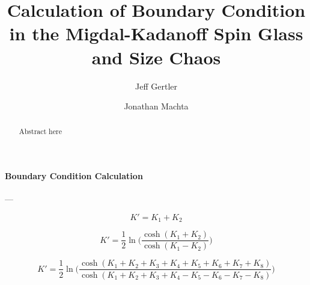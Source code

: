 \documentclass[twocolumn,aps,showpacs,superscriptaddress,prl]{revtex4}
\begin{document}
\title{Calculation of Boundary Condition in the Migdal-Kadanoff Spin Glass and Size Chaos}


\author{Jeff Gertler}


\author{Jonathan Machta}

\begin{abstract}

Abstract here

\end{abstract}

\maketitle



\paragraph*{Boundary Condition Calculation} ---


\begin{equation}
K' = K_1 + K_2
\label{eq:par}
\end{equation}

\begin{equation}
K' = \frac{1}{2}\ln \Big(\frac{\cosh(K_1+K_2)}{\cosh(K_1-K_2)} \Big)
\label{eq:ser}
\end{equation}

\begin{equation}
K' = \frac{1}{2}\ln \Big(\frac{\cosh(K_1+K_2+K_3+K_4+K_5+K_6+K_7+K_8)}{\cosh(K_1+K_2+K_3+K_4-K_5-K_6-K_7-K_8)} \Big)
\label{eq:mkrg}
\end{equation}





\end{document}
